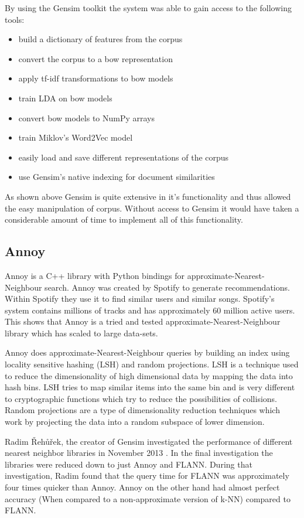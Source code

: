 By using the Gensim toolkit the system was able to gain access to the following tools:
\begin{itemize}
    \item build a dictionary of features from the corpus
    \item convert the corpus to a bow representation
    \item apply tf-idf transformations to bow models
    \item train LDA on bow models
    \item convert bow models to NumPy arrays
    \item train Miklov's Word2Vec model
    \item easily load and save different representations of the corpus
    \item use Gensim's native indexing for document similarities
\end{itemize}

As shown above Gensim is quite extensive in it's functionality and thus allowed the easy manipulation of corpus.
Without access to Gensim it would have taken a considerable amount of time to implement all of this functionality.

\subsection{Annoy}
Annoy is a C++ library with Python bindings for approximate-Nearest-Neighbour search.
Annoy was created by Spotify to generate recommendations.
Within Spotify they use it to find similar users and similar songs.
Spotify's system contains millions of tracks and has approximately 60 million active users.
This shows that Annoy is a tried and tested approximate-Nearest-Neighbour library which has scaled to large data-sets.

Annoy does approximate-Nearest-Neighbour queries by building an index using locality sensitive hashing (LSH) and random projections.
LSH is a technique used to reduce the dimensionality of high dimensional data by mapping the data into hash bins.
LSH tries to map similar items into the same bin and is very different to cryptographic functions which try to reduce the possibilities of collisions.
Random projections are a type of dimensionality reduction techniques which work by projecting the data into a random subspace of lower dimension\cite{Dasgupta2000}.

Radim {\v R}eh{\r u}{\v r}ek, the creator of Gensim investigated the performance of different nearest neighbor libraries in November 2013 \cite{radimKnnInvestigation}.
In the final investigation the libraries were reduced down to just Annoy and FLANN.
During that investigation, Radim found that the query time for FLANN was approximately four times quicker than Annoy.
Annoy on the other hand had almost perfect accuracy (When compared to a non-approximate version of k-NN) compared to FLANN.

